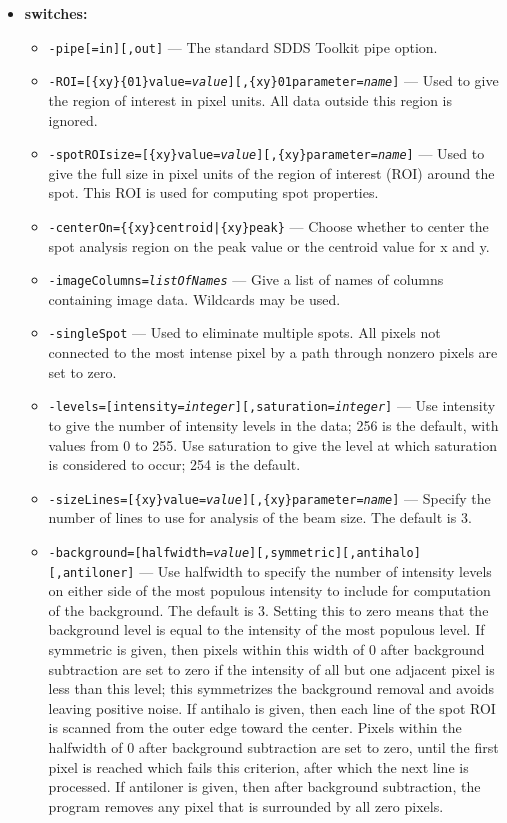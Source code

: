\begin{itemize}
\item {\bf switches:}
    \begin{itemize}
    \item {\tt -pipe[=in][,out]} --- The standard SDDS Toolkit pipe option.
    \item {\tt -ROI=[\{xy\}\{01\}value={\em value}][,\{xy\}{01}parameter={\em name}]} --- Used to give the region of interest in pixel units. All data outside this region is ignored.
    \item {\tt -spotROIsize=[\{xy\}value={\em value}][,\{xy\}parameter={\em name}]} --- Used to give the full size in pixel units of the region of interest (ROI) around the spot. This ROI is used for computing spot properties.
    \item {\tt -centerOn=\{\{xy\}centroid|\{xy\}peak\}} --- Choose whether to center the spot analysis region on the peak value or the centroid value for x and y.
    \item {\tt -imageColumns={\em listOfNames}} --- Give a list of names of columns containing image data. Wildcards may be used.
    \item {\tt -singleSpot} --- Used to eliminate multiple spots.  All pixels not connected to the most intense pixel by a path through nonzero pixels are set to zero.
    \item {\tt -levels=[intensity={\em integer}][,saturation={\em integer}]} --- Use intensity to give the number of intensity levels in the data; 256 is the default, with values from 0 to 255. Use saturation to give the level at which saturation is considered to occur; 254 is the default.
    \item {\tt -sizeLines=[\{xy\}value={\em value}][,\{xy\}parameter={\em name}]} --- Specify the number of lines to use for analysis of the beam size.  The default is 3.
    \item {\tt -background=[halfwidth={\em value}][,symmetric][,antihalo][,antiloner]} --- Use halfwidth to specify the number of intensity levels on either side of the most populous intensity to include for computation of the background. The default is 3.  Setting this to zero means that the background level is equal to the intensity of the most populous level. If symmetric is given, then pixels within this width of 0 after background subtraction are set to zero if the intensity of all but one adjacent pixel is less than this level; this symmetrizes the background removal and avoids leaving positive noise.  If antihalo is given, then each line of the spot ROI is scanned from the outer edge toward the center.  Pixels within the halfwidth of 0 after background subtraction are set to zero, until the first pixel is reached which fails this criterion, after which the next line is processed. If antiloner is given, then after background subtraction, the program removes any pixel that is surrounded by all zero pixels.

\end{itemize}
\end{itemize}

